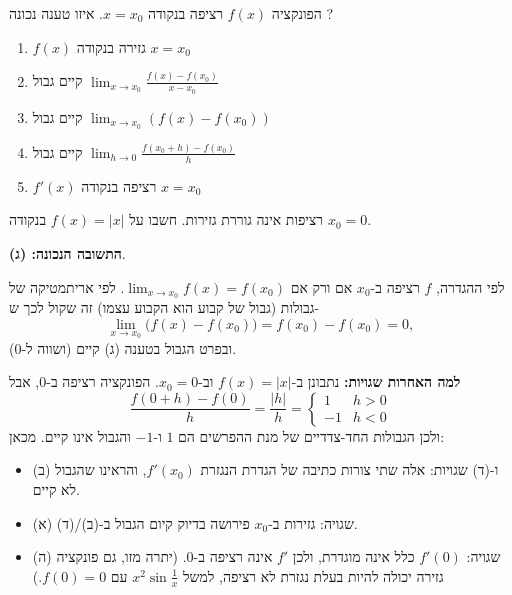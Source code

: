 
\begin{question}
הפונקציה $f(x)$ רציפה בנקודה $x=x_0$. איזו טענה נכונה ?
\begin{enumerate}
  \item $f(x)$ גזירה בנקודה $x=x_0$
  \item קיים גבול $\displaystyle\lim_{x\to x_0}\frac{f(x)-f(x_0)}{x-x_0}$
  \item קיים גבול $\displaystyle\lim_{x\to x_0}\left(f(x)-f(x_0)\right)$
  \item קיים גבול $\displaystyle\lim_{h\to 0}\frac{f(x_0+h)-f(x_0)}{h}$
  \item $f'(x)$ רציפה בנקודה $x=x_0$
\end{enumerate}
\end{question}

\begin{hint}
רציפות אינה גוררת גזירות. חשבו על $f(x)=|x|$ בנקודה $x_0=0$.
\end{hint}

\begin{solution}
\textbf{התשובה הנכונה: (ג)}.

לפי ההגדרה, $f$ רציפה ב-$x_0$ אם ורק אם $\lim_{x\to x_0}f(x)=f(x_0)$. לפי אריתמטיקה של גבולות (גבול של קבוע הוא הקבוע עצמו) זה שקול לכך ש-
\[
\lim_{x\to x_0}\bigl(f(x)-f(x_0)\bigr)=f(x_0)-f(x_0)=0 ,
\]
ובפרט הגבול בטענה (ג) קיים (ושווה ל-0).

\textbf{למה האחרות שגויות:} נתבונן ב-$f(x)=|x|$ וב-$x_0=0$. הפונקציה רציפה ב-0, אבל
\[
\frac{f(0+h)-f(0)}{h}=\frac{|h|}{h}=\begin{cases}1 & h>0\\ -1 & h<0\end{cases}
\]
ולכן הגבולות החד-צדדיים של מנת ההפרשים הם $1$ ו-$-1$ והגבול אינו קיים. מכאן:
\begin{itemize}
  \item (ב) ו-(ד) שגויות: אלה שתי צורות כתיבה של הגדרת הנגזרת $f'(x_0)$, והראינו שהגבול לא קיים.
  \item (א) שגויה: גזירות ב-$x_0$ פירושה בדיוק קיום הגבול ב-(ב)/(ד).
  \item (ה) שגויה: $f'(0)$ כלל אינה מוגדרת, ולכן $f'$ אינה רציפה ב-0. (יתרה מזו, גם פונקציה גזירה יכולה להיות בעלת נגזרת לא רציפה, למשל $x^2\sin\frac1x$ עם $f(0)=0$.)
\end{itemize}
\end{solution}
